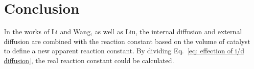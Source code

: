 \section{Conclusion}
In the works of Li and Wang, as well as Liu, the internal diffusion and external diffusion are combined with the reaction constant based on the volume of catalyst to define a new apparent reaction constant. 
By dividing Eq.~\eqref{eq: effection of i/d diffusion}, the real reaction constant could be calculated.


%
